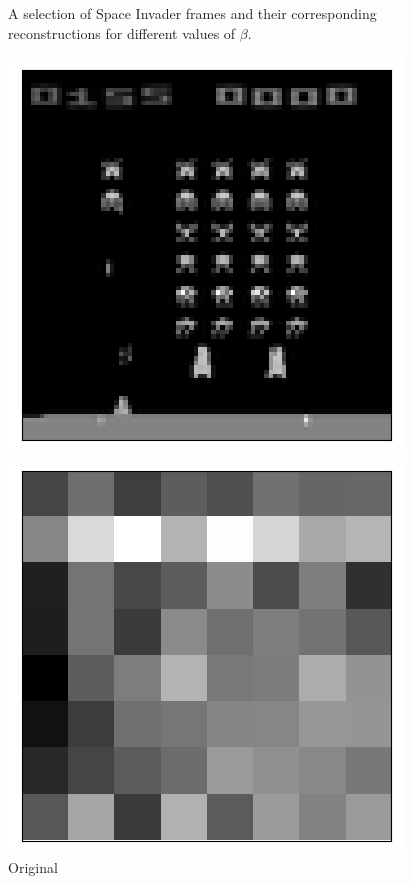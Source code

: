 \begin{figure}[h!]
\begin{multicols}{4}
    \caption{$\beta = 4$}
\end{multicols}
\caption{A selection of Space Invader frames and their corresponding reconstructions for different values of $\beta$.}
\label{fig:latent_image_originals_and_reconstructions}
\end{figure}


\begin{figure}[h!]
\centering
\captionsetup{justification=centering}
\begin{multicols}{4}
    \includegraphics[scale=0.4]{figures/results/latent_image/beta_1_sample_10_original.png}
    \caption{Original}
    \includegraphics[scale=0.4]{figures/results/latent_image/beta_1_sample_10_latent.png}

\end{multicols}
\end{figure}
